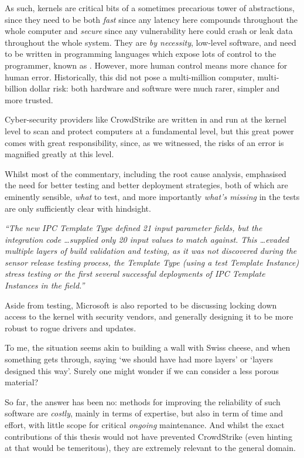 As such, kernels are critical bits of a sometimes precarious tower of
abstractions, since they need to be both \emph{fast} \textemdash{} since any
latency here compounds throughout the whole computer \textemdash{} and
\emph{secure} \textemdash{} since any vulnerability here could crash or leak
data throughout the whole system. They are \emph{by necessity}, low-level
software, and need to be written in programming languages which expose lots of
control to the programmer, known as .
However, more human control means more chance for human error. Historically,
this did not pose a multi-million computer, multi-billion dollar risk: both
hardware and software were much rarer, simpler and more trusted.

Cyber-security providers like CrowdStrike are written in  and run at the kernel level to scan and
protect computers at a fundamental level, but this great power comes with great
responsibility, since, as we witnessed, the risks of an error is magnified
greatly at this level.

Whilst most of the commentary, including the root cause
analysis, emphasised the need for better testing
and better deployment strategies, both of which are eminently sensible,
\emph{what} to test, and more importantly \emph{what's missing} in the tests
are only sufficiently clear with hindsight.

\emph{%
``The new IPC Template Type defined 21 input parameter fields, but the
integration code \ldots supplied only 20 input values to match against. This
\ldots evaded multiple layers of build validation and testing, as it was not
discovered during the sensor release testing process, the Template Type (using
a test Template Instance) stress testing or the first several successful
deployments of IPC Template Instances in the field.''
}

Aside from testing, Microsoft is also reported to be discussing locking down
access to the kernel with security vendors, and generally designing it to be
more robust to rogue drivers and updates.

To me, the situation seems akin to building a wall with Swiss cheese, and when
something gets through, saying `we should have had more layers' or `layers
designed this way'. Surely one might wonder if we can consider a less porous
material?

So far, the answer has been no: methods for improving the reliability of such
software are \emph{costly}, mainly in terms of expertise, but also in term of
time and effort, with little scope for critical \emph{ongoing} maintenance. And
whilst the exact contributions of this thesis would not have prevented
CrowdStrike (even hinting at that would be temeritous), they are extremely
relevant to the general domain.

